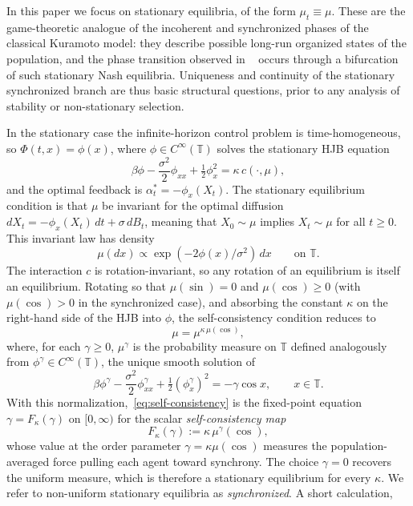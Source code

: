 \documentclass{amsart}
\newcommand{\T}{\mathbb T}
\begin{document}
In this paper we focus on stationary equilibria, of the form
$\mu_t\equiv\mu$. These are the game-theoretic analogue of the
incoherent and synchronized phases of the classical Kuramoto model:
they describe possible long-run organized states of the population,
and the phase transition observed in ~\cite{CCS} occurs through a bifurcation of
such stationary Nash equilibria. Uniqueness and continuity of the
stationary synchronized branch are thus basic structural questions,
prior to any analysis of stability or non-stationary selection.

In the stationary case the infinite-horizon control problem is
time-homogeneous, so $\Phi(t,x)=\phi(x)$, where
$\phi\in C^\infty(\T)$ solves the stationary
HJB equation
\[
\beta\phi-\frac{\sigma^2}{2}\phi_{xx}+\tfrac12\phi_x^2=\kappa\,c(\cdot,\mu),
\]
and the optimal feedback is $\alpha_t^*=-\phi_x(X_t)$. The stationary
equilibrium condition is that $\mu$ be invariant for the optimal
diffusion $dX_t=-\phi_x(X_t)\,dt+\sigma\,dB_t$, meaning that
$X_0\sim\mu$ implies $X_t\sim\mu$ for all $t\geq 0$. This invariant
law has density
\[
\mu(dx)\propto \exp(-2\phi(x)/\sigma^2)\,dx \qquad\text{on }\T.
\]
The interaction $c$ is rotation-invariant, so any rotation of an equilibrium is itself an
equilibrium. Rotating so that $\mu(\sin)=0$ and $\mu(\cos)\geq 0$
(with $\mu(\cos)>0$ in the synchronized case), and absorbing the constant
$\kappa$ on the right-hand side of the HJB into $\phi$, the
self-consistency condition reduces to
\begin{equation}\label{eq:self-consistency}
\mu=\mu^{\kappa\,\mu(\cos)},
\end{equation}
where, for each $\gamma\geq 0$, $\mu^\gamma$ is the probability measure
on $\T$ defined analogously from $\phi^\gamma\in C^\infty(\T)$, the
unique smooth solution of
\begin{equation}\label{eq:HJB-intro}
\beta\phi^\gamma-\frac{\sigma^2}{2}\phi^\gamma_{xx}
+\tfrac12(\phi^\gamma_x)^2=-\gamma\cos x,\qquad x\in\T.
\end{equation}
With this normalization,~\eqref{eq:self-consistency} is the fixed-point equation
$\gamma=F_\kappa(\gamma)$ on $[0,\infty)$ for the scalar
\emph{self-consistency map}
\[
F_\kappa(\gamma):=\kappa\,\mu^\gamma(\cos),
\]
whose value at the order parameter $\gamma=\kappa\mu(\cos)$ measures
the population-averaged force pulling each agent toward synchrony.
The choice $\gamma=0$ recovers the uniform measure, which is therefore
a stationary equilibrium for every $\kappa$. We refer to non-uniform
stationary equilibria as \emph{synchronized}. A short calculation,
\end{document}
